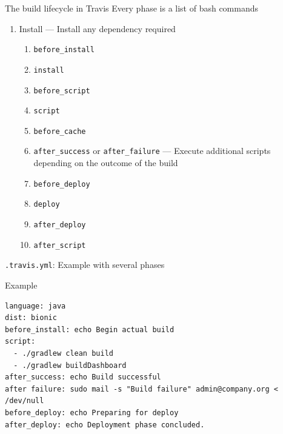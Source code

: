 \documentclass[presentation]{beamer}
\begin{document}
\begin{frame}[fragile]{The build lifecycle in Travis}
    Every phase is a list of bash commands
    \begin{enumerate}
        \item Install --- Install any dependency required
        \begin{enumerate}
            \item \texttt{before\_install}
            \item \texttt{install}
            \item \texttt{before\_script}
            \item \texttt{script}
            \item \texttt{before\_cache}
            \item \texttt{after\_success} or \texttt{after\_failure} --- Execute additional scripts depending on the outcome of the build
            \item \texttt{before\_deploy}
            \item \texttt{deploy}
            \item \texttt{after\_deploy}
            \item \texttt{after\_script}
        \end{enumerate}
    \end{enumerate}
\end{frame}

\begin{frame}[fragile]{\texttt{.travis.yml}: Example with several phases}
    \begin{block}{Example}
        \begin{verbatim}
language: java
dist: bionic
before_install: echo Begin actual build
script:
  - ./gradlew clean build
  - ./gradlew buildDashboard
after_success: echo Build successful
after failure: sudo mail -s "Build failure" admin@company.org < /dev/null
before_deploy: echo Preparing for deploy
after_deploy: echo Deployment phase concluded.
        \end{verbatim}
    \end{block}
\end{frame}
\end{document}
